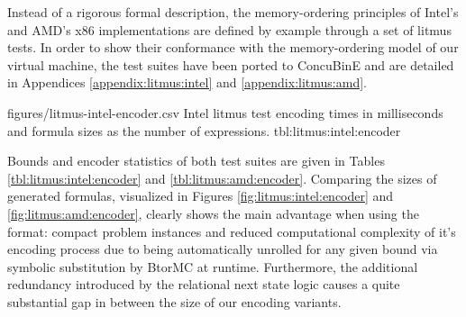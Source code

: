 Instead of a rigorous formal description, the memory-ordering principles of Intel's \cite{ref:Intel} and AMD's \cite{ref:AMD} x86 implementations are defined by example through a set of litmus tests.
In order to show their conformance with the memory-ordering model of our virtual machine, the test suites have been ported to ConcuBinE and are detailed in Appendices \ref{appendix:litmus:intel} and \ref{appendix:litmus:amd}.



\newcommand{\IntelRowHeader}[1]{\hyperref[tbl:litmus:intel:#1]{#1}}
\newcommand{\AMDRowHeader}[1]{\hyperref[tbl:litmus:amd:#1]{#1}}

\EncoderStatsTable
  {figures/litmus-intel-encoder.csv}
  {\textnumero}
  {\IntelRowHeader}
  {Intel litmus test encoding times in milliseconds and formula sizes as the number of expressions.}
  {tbl:litmus:intel:encoder}


Bounds and encoder statistics of both test suites are given in Tables \ref{tbl:litmus:intel:encoder} and \ref{tbl:litmus:amd:encoder}.
Comparing the sizes of generated formulas, visualized in Figures \ref{fig:litmus:intel:encoder} and \ref{fig:litmus:amd:encoder}, clearly shows the main advantage when using the {\BTOR} format:
compact problem instances and reduced computational complexity of it's encoding process
due to being automatically unrolled for any given bound via symbolic substitution by BtorMC at runtime.
Furthermore, the additional redundancy introduced by the relational next state logic causes a quite substantial gap in between the size of our {\SMTLIB} encoding variants.

